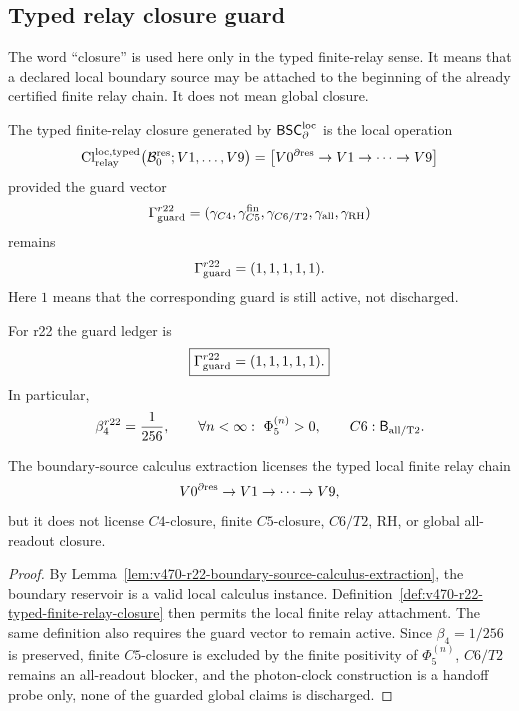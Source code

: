 \subsection{Typed relay closure guard}
\label{subsec:v470-r22-typed-relay-closure-guard}

The word ``closure'' is used here only in the typed finite-relay sense.  It means
that a declared local boundary source may be attached to the beginning of the
already certified finite relay chain.  It does not mean global closure.

\begin{definition}
\label{def:v470-r22-typed-finite-relay-closure}
The typed finite-relay closure generated by \(\mathsf{BSC}_{\partial}^{\rm loc}\)
is the local operation
\[
\mathrm{Cl}_{\rm relay}^{\rm loc,typed}
\bigl(\mathcal B_0^{\rm res};V1,\ldots,V9\bigr)
=
\left[
V0^{\partial{\rm res}}\to V1\to\cdots\to V9
\right]
\]
provided the guard vector
\[
\Gamma_{\rm guard}^{r22}
=
(\gamma_{C4},\gamma_{C5}^{\rm fin},\gamma_{C6/T2},\gamma_{\rm all},\gamma_{\rm RH})
\]
remains
\[
\Gamma_{\rm guard}^{r22}=(1,1,1,1,1).
\]
Here \(1\) means that the corresponding guard is still active, not discharged.
\end{definition}

For r22 the guard ledger is
\[
\boxed{
\Gamma_{\rm guard}^{r22}=(1,1,1,1,1).
}
\]
In particular,
\[
\beta_4^{r22}=\frac1{256},
\qquad
\forall n<\infty:\ \Phi_5^{(n)}>0,
\qquad
C6:\mathsf B_{\rm all/T2}.
\]

\begin{proposition}
\label{prop:v470-r22-typed-relay-closure-guard}
The boundary-source calculus extraction licenses the typed local finite relay
chain
\[
V0^{\partial{\rm res}}\to V1\to\cdots\to V9,
\]
but it does not license \(C4\)-closure, finite \(C5\)-closure, \(C6/T2\), RH, or
global all-readout closure.
\end{proposition}

\begin{proof}
By Lemma~\ref{lem:v470-r22-boundary-source-calculus-extraction}, the boundary
reservoir is a valid local calculus instance.  Definition~\ref{def:v470-r22-typed-finite-relay-closure}
then permits the local finite relay attachment.  The same definition also
requires the guard vector to remain active.  Since \(\beta_4=1/256\) is preserved,
finite \(C5\)-closure is excluded by the finite positivity of \(\Phi_5^{(n)}\),
\(C6/T2\) remains an all-readout blocker, and the photon-clock construction is a
handoff probe only, none of the guarded global claims is discharged.
\end{proof}

